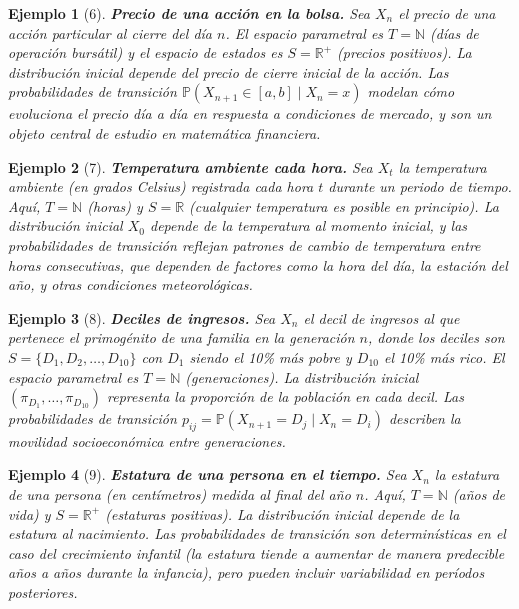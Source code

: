 \documentclass[12pt]{book}
\newtheorem{example}{Ejemplo}[chapter]
\begin{document}
\begin{example}[6]
\textbf{Precio de una acción en la bolsa.} Sea $X_n$ el precio de una acción particular al cierre del día $n$. El espacio parametral es $T = \mathbb{N}$ (días de operación bursátil) y el espacio de estados es $S = \mathbb{R}^+$ (precios positivos). La distribución inicial depende del precio de cierre inicial de la acción. Las probabilidades de transición $\mathbb{P}(X_{n+1} \in [a, b] \mid X_n = x)$ modelan cómo evoluciona el precio día a día en respuesta a condiciones de mercado, y son un objeto central de estudio en matemática financiera.
\end{example}

\begin{example}[7]
\textbf{Temperatura ambiente cada hora.} Sea $X_t$ la temperatura ambiente (en grados Celsius) registrada cada hora $t$ durante un periodo de tiempo. Aquí, $T = \mathbb{N}$ (horas) y $S = \mathbb{R}$ (cualquier temperatura es posible en principio). La distribución inicial $X_0$ depende de la temperatura al momento inicial, y las probabilidades de transición reflejan patrones de cambio de temperatura entre horas consecutivas, que dependen de factores como la hora del día, la estación del año, y otras condiciones meteorológicas.
\end{example}

\begin{example}[8]
\textbf{Deciles de ingresos.} Sea $X_n$ el decil de ingresos al que pertenece el primogénito de una familia en la generación $n$, donde los deciles son $S = \{D_1, D_2, \ldots, D_{10}\}$ con $D_1$ siendo el 10\% más pobre y $D_{10}$ el 10\% más rico. El espacio parametral es $T = \mathbb{N}$ (generaciones). La distribución inicial $(\pi_{D_1}, \ldots, \pi_{D_{10}})$ representa la proporción de la población en cada decil. Las probabilidades de transición $p_{ij} = \mathbb{P}(X_{n+1} = D_j \mid X_n = D_i)$ describen la movilidad socioeconómica entre generaciones.
\end{example}

\begin{example}[9]
\textbf{Estatura de una persona en el tiempo.} Sea $X_n$ la estatura de una persona (en centímetros) medida al final del año $n$. Aquí, $T = \mathbb{N}$ (años de vida) y $S = \mathbb{R}^+$ (estaturas positivas). La distribución inicial depende de la estatura al nacimiento. Las probabilidades de transición son determinísticas en el caso del crecimiento infantil (la estatura tiende a aumentar de manera predecible años a años durante la infancia), pero pueden incluir variabilidad en períodos posteriores.
\end{example}
\end{document}
